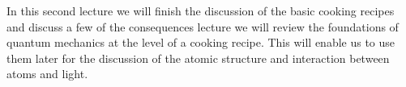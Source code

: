 In this second lecture we will finish the discussion of the basic cooking recipes and discuss a few of the consequences lecture we will review the foundations of quantum mechanics at the level of a cooking recipe. This will enable us to use them later for the discussion of the atomic structure and interaction between atoms and light.